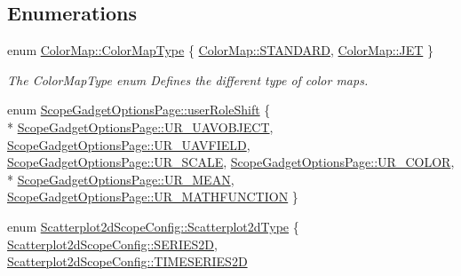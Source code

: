 \subsection*{Enumerations}
\begin{DoxyCompactItemize}
\item 
enum \hyperlink{group___scope_plugin_ga7f4f087196557757ec8061242e795031}{Color\-Map\-::\-Color\-Map\-Type} \{ \hyperlink{group___scope_plugin_gga7f4f087196557757ec8061242e795031ada2d98ce081f031c9195188175d92d44}{Color\-Map\-::\-S\-T\-A\-N\-D\-A\-R\-D}, 
\hyperlink{group___scope_plugin_gga7f4f087196557757ec8061242e795031a022cb7b62aaf4ea9c2c48375d4b187d8}{Color\-Map\-::\-J\-E\-T}
 \}
\begin{DoxyCompactList}\small\item\em The Color\-Map\-Type enum Defines the different type of color maps. \end{DoxyCompactList}\item 
enum \hyperlink{group___scope_plugin_gabc55f54668fc1565f24893b44bc2affe}{Scope\-Gadget\-Options\-Page\-::user\-Role\-Shift} \{ \\*
\hyperlink{group___scope_plugin_ggabc55f54668fc1565f24893b44bc2affea1ca47671f95b0080d7fec89b625ecdae}{Scope\-Gadget\-Options\-Page\-::\-U\-R\-\_\-\-U\-A\-V\-O\-B\-J\-E\-C\-T}, 
\hyperlink{group___scope_plugin_ggabc55f54668fc1565f24893b44bc2affea9d7b3ed8977c973cd47ec9c590888e83}{Scope\-Gadget\-Options\-Page\-::\-U\-R\-\_\-\-U\-A\-V\-F\-I\-E\-L\-D}, 
\hyperlink{group___scope_plugin_ggabc55f54668fc1565f24893b44bc2affeacf5de4c7658c11db0a432311ce7e302e}{Scope\-Gadget\-Options\-Page\-::\-U\-R\-\_\-\-S\-C\-A\-L\-E}, 
\hyperlink{group___scope_plugin_ggabc55f54668fc1565f24893b44bc2affea9314bed2c7220cb80e1c7e1c643e7af8}{Scope\-Gadget\-Options\-Page\-::\-U\-R\-\_\-\-C\-O\-L\-O\-R}, 
\\*
\hyperlink{group___scope_plugin_ggabc55f54668fc1565f24893b44bc2affea43e3a9f89e27568aa426874ed469620a}{Scope\-Gadget\-Options\-Page\-::\-U\-R\-\_\-\-M\-E\-A\-N}, 
\hyperlink{group___scope_plugin_ggabc55f54668fc1565f24893b44bc2affeab9a9633c8bc6a72c30f2a2962ff1e882}{Scope\-Gadget\-Options\-Page\-::\-U\-R\-\_\-\-M\-A\-T\-H\-F\-U\-N\-C\-T\-I\-O\-N}
 \}
\item 
enum \hyperlink{group___scope_plugin_gac3cffd2a84d02f4ebfba6df970d03e97}{Scatterplot2d\-Scope\-Config\-::\-Scatterplot2d\-Type} \{ \hyperlink{group___scope_plugin_ggac3cffd2a84d02f4ebfba6df970d03e97a8ac04199dbef37beba1b81fe42278b3a}{Scatterplot2d\-Scope\-Config\-::\-S\-E\-R\-I\-E\-S2\-D}, 
\hyperlink{group___scope_plugin_ggac3cffd2a84d02f4ebfba6df970d03e97af135d74488370bcdd47ee9744b513263}{Scatterplot2d\-Scope\-Config\-::\-T\-I\-M\-E\-S\-E\-R\-I\-E\-S2\-D}

\end{DoxyCompactItemize}
